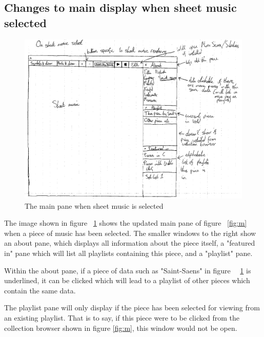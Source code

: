 \begin{appendices}
\subsection{Changes to main display when sheet music selected}
\begin{figure}[H]
	\centering
	\includegraphics[width=400pt]{designs/sheet_music}
	\caption{The main pane when sheet music is selected}
	\label{fig:sheet}	
\end{figure}
The image shown in figure ~\ref{fig:sheet} shows the updated main pane of figure ~\ref{fig:m} when a piece of music has been selected. The smaller windows to the right show an about pane, which displays all information about the piece itself, a "featured in" pane which will list all playlists containing this piece, and a "playlist" pane. 

Within the about pane, if a piece of data such as "Saint-Saens" in figure ~~\ref{fig:sheet} is underlined, it can be clicked which will lead to a playlist of other pieces which contain the same data.

The playlist pane will only display if the piece has been selected for viewing from an existing playlist. That is to say, if this piece were to be clicked from the collection browser shown in figure \ref{fig:m}, this window would not be open.


\end{appendices}
